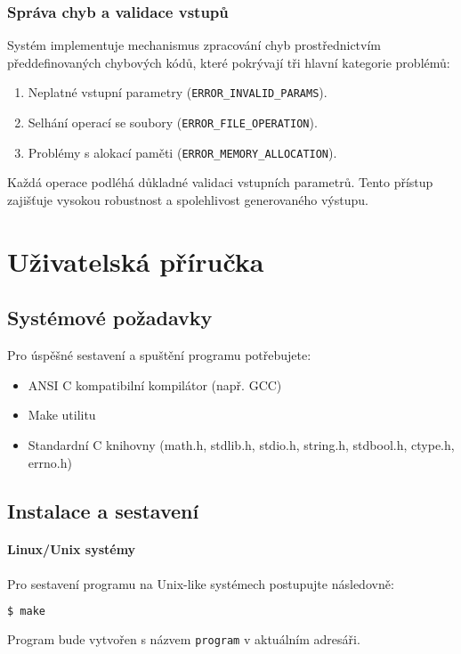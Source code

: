 \documentclass[12pt]{article} %
\begin{document}
\subsubsection{Správa chyb a validace vstupů}

Systém implementuje mechanismus zpracování chyb prostřednictvím předdefinovaných chybových kódů, které pokrývají tři hlavní kategorie problémů:

\begin{enumerate}
    \item Neplatné vstupní parametry (\texttt{ERROR\_INVALID\_PARAMS}).
    \item Selhání operací se soubory (\texttt{ERROR\_FILE\_OPERATION}).
    \item Problémy s alokací paměti (\texttt{ERROR\_MEMORY\_ALLOCATION}).
\end{enumerate}

Každá operace podléhá důkladné validaci vstupních parametrů. Tento přístup zajišťuje vysokou robustnost a spolehlivost generovaného výstupu.

\section{Uživatelská příručka}
\subsection{Systémové požadavky}
Pro úspěšné sestavení a spuštění programu potřebujete:
\begin{itemize}
\item ANSI C kompatibilní kompilátor (např. GCC)
\item Make utilitu
\item Standardní C knihovny (math.h, stdlib.h, stdio.h, string.h, stdbool.h, ctype.h, errno.h)
\end{itemize}
\subsection{Instalace a sestavení}
\paragraph{Linux/Unix systémy}
Pro sestavení programu na Unix-like systémech postupujte následovně:
\begin{lstlisting}[language=bash]
$ make
\end{lstlisting}
Program bude vytvořen s názvem \texttt{program} v aktuálním adresáři.
\end{document}
